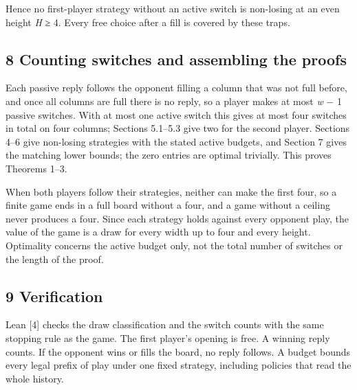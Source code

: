 \documentclass[
  a4paper,
]{article}
\begin{document}
Hence no first-player strategy without an active switch is non-losing at
an even height \emph{H} ≥ 4. Every free choice after a fill is covered
by these traps.

\subsection{8 Counting switches and assembling the
proofs}\label{counting-switches-and-assembling-the-proofs}

Each passive reply follows the opponent filling a column that was not
full before, and once all columns are full there is no reply, so a
player makes at most \emph{w} − 1 passive switches. With at most one
active switch this gives at most four switches in total on four columns;
Sections 5.1--5.3 give two for the second player. Sections 4--6 give
non-losing strategies with the stated active budgets, and Section 7
gives the matching lower bounds; the zero entries are optimal trivially.
This proves Theorems 1--3.

When both players follow their strategies, neither can make the first
four, so a finite game ends in a full board without a four, and a game
without a ceiling never produces a four. Since each strategy holds
against every opponent play, the value of the game is a draw for every
width up to four and every height. Optimality concerns the active budget
only, not the total number of switches or the length of the proof.

\subsection{9 Verification}\label{verification}

Lean {[}4{]} checks the draw classification and the switch counts with
the same stopping rule as the game. The first player's opening is free.
A winning reply counts. If the opponent wins or fills the board, no
reply follows. A budget bounds every legal prefix of play under one
fixed strategy, including policies that read the whole history.
\end{document}
